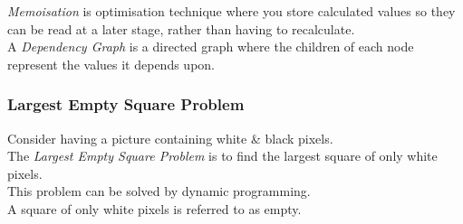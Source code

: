 \documentclass[11pt,a4paper]{article}
\begin{document}
\textit{Memoisation} is optimisation technique where you store calculated values so they can be read at a later stage, rather than having to recalculate.\\

A \textit{Dependency Graph} is a directed graph where the children of each node represent the values it depends upon.

\subsubsection{Largest Empty Square Problem}

Consider having a picture containing white \& black pixels.\\
The \textit{Largest Empty Square Problem} is to find the largest square of only white pixels.\\
This problem can be solved by dynamic programming.\\
\nb A square of only white pixels is referred to as empty.\\
\end{document}
